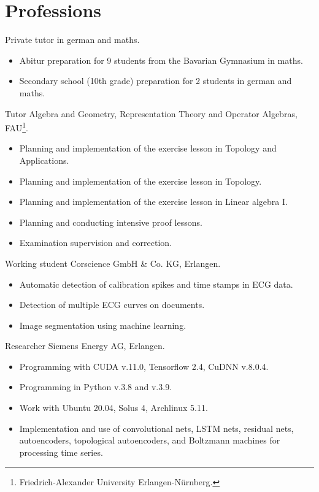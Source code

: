 \documentclass[a4paper,12pt]{article}
\newcommand{\years}[1]{\marginnote{\scriptsize #1}}
\begin{document}
\section*{Professions}
\years{2024--25} Private tutor in german and maths.
\begin{itemize}
    \item Abitur preparation for 9 students from the Bavarian Gymnasium in maths.
    \item Secondary school (10th grade) preparation for 2 students in german and maths. 
\end{itemize}
\years{2023--24} Tutor Algebra and Geometry, Representation Theory and Operator Algebras, FAU\footnote{Friedrich-Alexander University Erlangen-Nürnberg.}.
\begin{itemize}
    \item Planning and implementation of the exercise lesson in \glqq Topology and Applications\grqq.
    \item Planning and implementation of the exercise lesson in \glqq Topology\grqq.
    \item Planning and implementation of the exercise lesson in \glqq Linear algebra I\grqq.
    \item Planning and conducting intensive proof lessons.
    \item Examination supervision and correction.
\end{itemize}
\years{2021--22} Working student Corscience GmbH \& Co. KG, Erlangen.
\begin{itemize}
    \item Automatic detection of calibration spikes and time stamps in ECG data.
    \item Detection of multiple ECG curves on documents.
    \item Image segmentation using machine learning.
\end{itemize}
\years{2019--21} Researcher Siemens Energy AG, Erlangen.
\begin{itemize}
    \item Programming with CUDA v.11.0, Tensorflow 2.4, CuDNN v.8.0.4.
    \item Programming in Python v.3.8 and v.3.9.
    \item Work with Ubuntu 20.04, Solus 4, Archlinux 5.11.
    \item Implementation and use of convolutional nets, LSTM nets, residual nets, autoencoders, topological autoencoders, and Boltzmann machines for processing time series.
\end{itemize}
\end{document}
